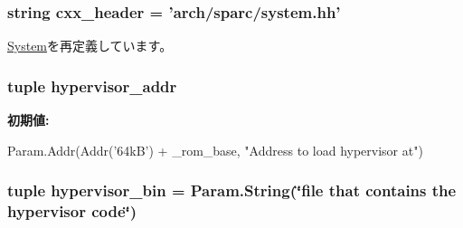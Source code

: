 \label{classSparcSystem_1_1SparcSystem_acecae3b3adc0067eb514a0643bc5a8ea}
\hypertarget{classSparcSystem_1_1SparcSystem_a17da7064bc5c518791f0c891eff05fda}{
\subsubsection[{cxx\_\-header}]{\setlength{\rightskip}{0pt plus 5cm}string cxx\_\-header = 'arch/sparc/system.hh'}}
\label{classSparcSystem_1_1SparcSystem_a17da7064bc5c518791f0c891eff05fda}


\hyperlink{classSystem_1_1System_a17da7064bc5c518791f0c891eff05fda}{System}を再定義しています。\hypertarget{classSparcSystem_1_1SparcSystem_ab5969daf7ba890fbaab05aaa9f30d5b5}{
\subsubsection[{hypervisor\_\-addr}]{\setlength{\rightskip}{0pt plus 5cm}tuple hypervisor\_\-addr}}
\label{classSparcSystem_1_1SparcSystem_ab5969daf7ba890fbaab05aaa9f30d5b5}
{\bfseries 初期値:}
\begin{DoxyCode}
Param.Addr(Addr('64kB') + _rom_base,
                                 "Address to load hypervisor at")
\end{DoxyCode}
\hypertarget{classSparcSystem_1_1SparcSystem_aff5b3420b8f86ead7be9581df53c2309}{
\subsubsection[{hypervisor\_\-bin}]{\setlength{\rightskip}{0pt plus 5cm}tuple hypervisor\_\-bin = Param.String(\char`\"{}file that contains the {\bf hypervisor} code\char`\"{})}}
\label{classSparcSystem_1_1SparcSystem_aff5b3420b8f86ead7be9581df53c2309}
